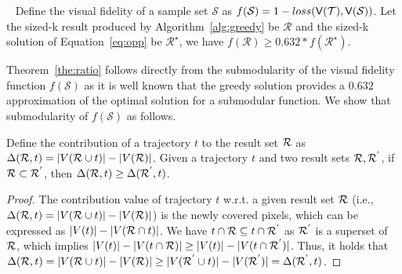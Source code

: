 \begin{theorem}~\label{the:ratio}
Define the visual fidelity of a sample set $\mathcal{S}$ as $f(\mathcal{S})=1-loss(\mathsf{V}(\mathcal{T}),\mathsf{V}(\mathcal{S}))$. Let the sized-k result produced by Algorithm~\ref{alg:greedy} be $\mathcal{R}$ and the sized-k solution of Equation~\eqref{eq:opp} be $\mathcal{R}^{\star}$, we have $f(\mathcal{R})\ge 0.632*f(\mathcal{R}^{\star})$.
\end{theorem}

Theorem~\ref{the:ratio} follows directly from the submodularity of the visual fidelity function $f(\mathcal{S})$ as it is well known that the greedy solution provides a $0.632$ approximation of the optimal solution for a submodular function. We show that submodularity of $f(\mathcal{S})$ as follows.      

\begin{lemma}[Submodularity]\label{lem:submodular}
	Define the contribution of a trajectory $t$ to the result set $\mathcal{R}$ as $\Delta(\mathcal{R}, t) = |V(\mathcal{R} \cup t)| - |V(\mathcal{R})|$.
	Given a trajectory $t$ and two result sets $\mathcal{R},\mathcal{R}^{'}$, if $\mathcal{R} \subset \mathcal{R}^{'}$, then $ \Delta(\mathcal{R}, t) \geq \Delta(\mathcal{R}^{'}, t)$.
\end{lemma}


\begin{proof}
	The contribution value of trajectory $t$ w.r.t. a given result set $\mathcal{R}$ (i.e., $\Delta(\mathcal{R}, t) = |V(\mathcal{R} \cup t)| - |V(\mathcal{R})|$) is the newly covered pixels, which can be expressed as $|V(t)| - |V(\mathcal{R} \cap t)|$.
	We have $t \cap \mathcal{R} \subseteq  t \cap \mathcal{R}^{'}$ as $\mathcal{R}^{'}$ is a superset of $\mathcal{R}$, which implies $|V(t)| - |V(t \cap \mathcal{R})| \geq |V(t)| - |V(t \cap \mathcal{R}^{'})|$.
	Thus, it holds that $\Delta(\mathcal{R}, t) = |V(\mathcal{R} \cup t)| - |V(\mathcal{R})| \geq |V(\mathcal{R}^{'} \cup t)| - |V(\mathcal{R}^{'})|= \Delta(\mathcal{R}^{'}, t)$.
\end{proof}



